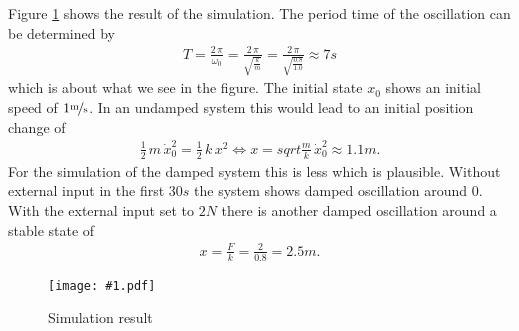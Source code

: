 \documentclass[a4paper,12pt]{article}
\newcommand{\Fig}[3]{%
	\begin{figure}[htb]%
	\begin{center}%
	\texttt{[image: \#1.pdf]}%
	\end{center}%
	\caption{#3\label{fig:#1}}%
	\end{figure}%
	}
\newcommand{\FigRef}[1]{%
	Figure \ref{fig:#1}%
	}
\begin{document}
\FigRef{simulate} shows the result of the simulation. The period time of the
oscillation can be determined by
\begin{eqnarray}
T=\frac{2\,\pi}{\omega_0}=\frac{2\,\pi}{\sqrt{\frac{k}{m}}}=\frac{2\,\pi}{\sqrt{\frac{0.8}{1.0}}}\approx 7\unit{s}
\end{eqnarray}
which is about what we see in the figure. The initial state $x_0$ shows an
initial speed of $1\unitfrac{m}{s}$. In an undamped system this would lead
to an initial position change of
\begin{eqnarray}
\frac{1}{2}\,m\,\dot{x}_0^2=\frac{1}{2}\,k\,x^2\Leftrightarrow x=sqrt{\frac{m}{k}\,\dot{x}_0^2}\approx1.1\unit{m}.
\end{eqnarray}
For the simulation of the damped system this is less which is plausible.
Without external input in the first $30\unit{s}$ the system shows damped
oscillation around 0. With the external input set to $2\unit{N}$ there
is another damped oscillation around a stable state of
\begin{eqnarray}
x=\frac{F}{k}=\frac{2}{0.8}=2.5\unit{m}.
\end{eqnarray}

\Fig{simulate}{1.0}{Simulation result}


\end{document}

